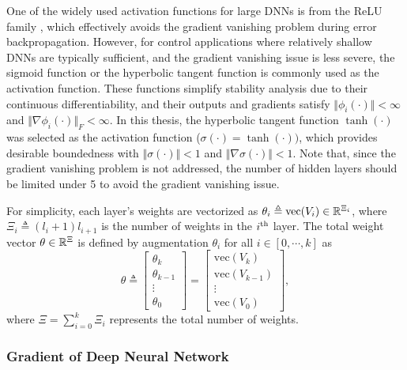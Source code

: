 One of the widely used activation functions for large DNNs is from the ReLU family \cite{RN15}, which effectively avoids the gradient vanishing problem during error backpropagation. 
However, for control applications where relatively shallow DNNs are typically sufficient, and the gradient vanishing issue is less severe, the sigmoid function or the hyperbolic tangent function is commonly used as the activation function. 
These functions simplify stability analysis due to their continuous differentiability, and their outputs and gradients satisfy $\Vert \phi_i(\cdot)\Vert < \infty$ and $\Vert \nabla\phi_i(\cdot)\Vert_F < \infty$. 
In this thesis, the hyperbolic tangent function $\tanh(\cdot)$ was selected as the activation function (\ie $\sigma(\cdot) = \tanh(\cdot))$, which provides desirable boundedness with $\Vert\sigma(\cdot)\Vert<1$ and $\Vert\nabla\sigma(\cdot)\Vert< 1$.
Note that, since the gradient vanishing problem is not addressed, the number of hidden layers should be limited under 5 to avoid the gradient vanishing issue.

For simplicity, each layer's weights are vectorized as $\theta_i\triangleq\text{vec}(V_i)\in\mathbb{R}^{\Xi_i}$, where $\Xi_i\triangleq (l_i+1)l_{i+1}$ is the number of weights in the $i\textsuperscript{th}$ layer. The total weight vector $\theta\in\mathbb{R}^{\Xi}$ is defined by augmentation $\theta_i$ for all $i\in \left[0,\cdots,k\right]$ as 
\begin{equation}
    \theta \triangleq 
    \begin{bmatrix}
        \theta_k\\
        \theta_{k-1}\\
        \vdots\\
        \theta_0
    \end{bmatrix}
    =
    \begin{bmatrix}
        \text{vec}(V_k)\\
        \text{vec}(V_{k-1})\\
        \vdots\\
        \text{vec}(V_0)
    \end{bmatrix},
\end{equation}
where $\Xi={\sum_{i=0}^{k} \Xi_i}$ represents the total number of weights. 

\subsubsection{Gradient of Deep Neural Network} \label{chap2:sec:DNNgrad}

